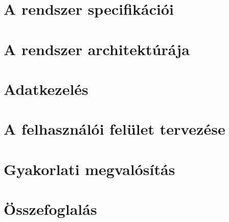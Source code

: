 \documentclass[12pt, twoside]{report}
\begin{document}
\chapter{A rendszer specifikációi}


\chapter{A rendszer architektúrája}


\chapter{Adatkezelés}


\chapter{A felhasználói felület tervezése}


\chapter{Gyakorlati megvalósítás}


\chapter{Összefoglalás}


\newpage
{}


\end{document}
